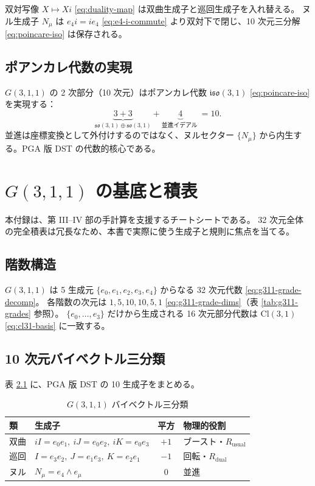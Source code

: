 \documentclass[dvipdfmx,a4paper,oneside]{jsbook}
\numberwithin{equation}{chapter}
\begin{document}
双対写像 \(X \mapsto Xi\) \eqref{eq:duality-map} は双曲生成子と巡回生成子を入れ替える。
ヌル生成子 \(N_\mu\) は \(e_4 i = i e_4\) \eqref{eq:e4-i-commute} より双対下で閉じ、10 次元三分解 \eqref{eq:poincare-iso} は保存される。

\section{ポアンカレ代数の実現}

\(G(3,1,1)\) の 2 次部分（10 次元）はポアンカレ代数 \(\mathfrak{iso}(3,1)\) \eqref{eq:poincare-iso} を実現する：
\begin{equation}
  \underbrace{3 + 3}_{\mathfrak{so}(3,1) \oplus \mathfrak{so}(3,1)} + \underbrace{4}_{\text{並進イデアル }} = 10.
  \label{eq:app-poincare}
\end{equation}
並進は座標変換として外付けするのではなく、ヌルセクター \(\{N_\mu\}\) から内生する。PGA 版 DST の代数的核心である。

\chapter{\texorpdfstring{\(G(3,1,1)\) の基底と積表}{G(3,1,1) の基底と積表}}

本付録は、第 III–IV 部の手計算を支援するチートシートである。
32 次元全体の完全積表は冗長なため、本書で実際に使う生成子と規則に焦点を当てる。

\section{階数構造}

\(G(3,1,1)\) は 5 生成元 \(\{e_0,e_1,e_2,e_3,e_4\}\) からなる 32 次元代数 \eqref{eq:g311-grade-decomp}。
各階数の次元は \(1,5,10,10,5,1\) \eqref{eq:g311-grade-dims}（表 \ref{tab:g311-grades} 参照）。
\(\{e_0,\ldots,e_3\}\) だけから生成される 16 次元部分代数は \(\mathrm{Cl}(3,1)\) \eqref{eq:cl31-basis} に一致する。

\section{10 次元バイベクトル三分類}

表 \ref{tab:app-biv-class} に、PGA 版 DST の 10 生成子をまとめる。

\begin{table}[htbp]
  \centering
  \caption{\(G(3,1,1)\) バイベクトル三分類}
  \label{tab:app-biv-class}
  \begin{tabular}{@{}llcl@{}}
    \toprule
    類 & 生成子 & 平方 & 物理的役割 \\
    \midrule
    双曲 & \(iI=e_0e_1,\ iJ=e_0e_2,\ iK=e_0e_3\) & \(+1\) & ブースト・\(R_{\mathrm{usual}}\) \\
    巡回 & \(I=e_3e_2,\ J=e_1e_3,\ K=e_2e_1\) & \(-1\) & 回転・\(R_{\mathrm{dual}}\) \\
    ヌル & \(N_\mu=e_4\wedge e_\mu\) & \(0\) & 並進 \\
    \bottomrule
  \end{tabular}
\end{table}
\end{document}
